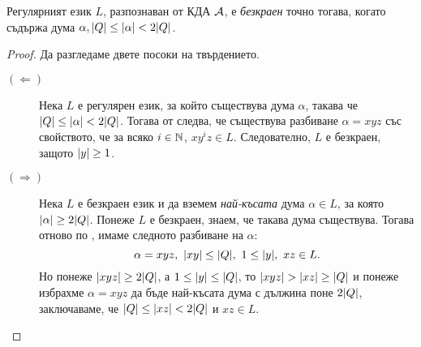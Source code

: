 

\begin{proposition}
  \label{pr:regular:pumping-applications:infinity}
  Регулярният език $L$, 
  разпознаван от КДА $\mathcal{A}$, е {\em безкраен} точно тогава, когато съдържа дума $\alpha, \vert{Q}\vert \leq \vert{\alpha}\vert < 2\vert{Q}\vert$.
\end{proposition}
\begin{proof}
  Да разгледаме двете посоки на твърдението.
  \begin{description}
  \item[$(\Leftarrow)$]
    Нека $L$ е регулярен език, за който съществува дума $\alpha$, такава че $\vert{Q}\vert \leq \vert{\alpha}\vert < 2\vert{Q}\vert$.
    Тогава от  следва, че съществува разбиване $\alpha = xyz$ със свойството, че
    за всяко $i \in \mathbb{N}$, $xy^iz \in L$. Следователно, $L$ е безкраен, защото $\vert{y}\vert \geq 1$.
  \item[$(\Rightarrow)$]
    Нека $L$ е безкраен език и %
    да вземем {\em най-късата} дума $\alpha \in L$, за която $\vert{\alpha}\vert \geq 2\vert{Q}\vert$.
    Понеже $L$ е безкраен, знаем, че такава дума съществува.
    Тогава отново по , имаме следното разбиване на $\alpha$:
    \[\alpha = xyz,\ \abs{xy} \leq \abs{Q},\ 1\leq \abs{y},\ xz \in L.\]
    Но понеже $\vert{xyz}\vert \geq 2\vert{Q}\vert$, а $1 \leq \vert{y}\vert \leq \vert{Q}\vert$, то $\vert{xyz}\vert > \vert{xz}\vert \geq \vert{Q}\vert$ и понеже избрахме $\alpha = xyz$
    да бъде най-късата дума с дължина поне $2\vert{Q}\vert$, заключаваме, че $\vert{Q}\vert \leq \vert{xz}\vert < 2\vert{Q}\vert$ и $xz \in L$.
  \end{description}
\end{proof}



